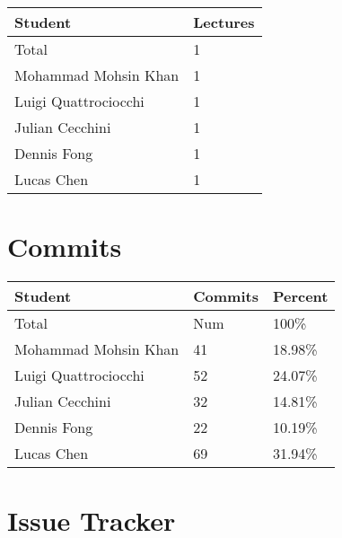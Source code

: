 \documentclass{article}
\begin{document}
\begin{table}[H]
\centering
\begin{tabular}{ll}
\toprule
\textbf{Student} & \textbf{Lectures}\\
\midrule
Total & 1\\
Mohammad Mohsin Khan & 1\\
Luigi Quattrociocchi & 1\\
Julian Cecchini & 1\\
Dennis Fong & 1\\
Lucas Chen & 1\\
\bottomrule
\end{tabular}
\end{table}


\section{Commits}


\begin{table}[H]
\centering
\begin{tabular}{lll}
\toprule
\textbf{Student} & \textbf{Commits} & \textbf{Percent}\\
\midrule
Total & Num & 100\% \\
Mohammad Mohsin Khan & 41 & 18.98\% \\
Luigi Quattrociocchi & 52 & 24.07\% \\
Julian Cecchini & 32 & 14.81\% \\
Dennis Fong & 22 & 10.19\% \\
Lucas Chen & 69 & 31.94\% \\
\bottomrule
\end{tabular}
\end{table}


\section{Issue Tracker}
\end{document}

